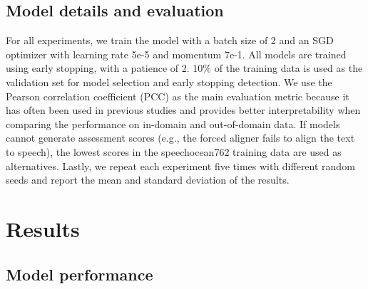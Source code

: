 \documentclass{Interspeech2024}
\begin{document}
\subsection{Model details and evaluation}
For all experiments, we train the model with a batch size of 2 and an SGD optimizer with learning rate 5e-5 and momentum 7e-1. All models are trained using early stopping, with a patience of 2. 10\% of the training data is used as the validation set for model selection and early stopping detection. We use the Pearson correlation coefficient (PCC) as the main evaluation metric because it has often been used in previous studies and provides better interpretability when comparing the performance on in-domain and out-of-domain data. If models cannot generate assessment scores (e.g., the forced aligner fails to align the text to speech), the lowest scores in the speechocean762 training data are used as alternatives. Lastly, we repeat each experiment five times with different random seeds and report the mean and standard deviation of the results. 

\section{Results}

\subsection{Model performance}\label{subsec:sys_performance}
\end{document}
